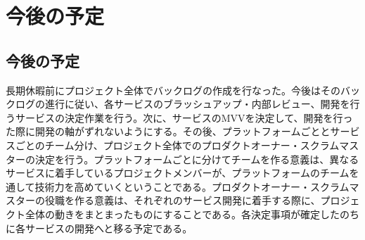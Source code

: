 \chapter{今後の予定}
\section{今後の予定}

長期休暇前にプロジェクト全体でバックログの作成を行なった。今後はそのバックログの進行に従い、各サービスのブラッシュアップ・内部レビュー、開発を行うサービスの決定作業を行う。次に、サービスのMVVを決定して、開発を行った際に開発の軸がずれないようにする。その後、プラットフォームごととサービスごとのチーム分け、プロジェクト全体でのプロダクトオーナー・スクラムマスターの決定を行う。プラットフォームごとに分けてチームを作る意義は、異なるサービスに着手しているプロジェクトメンバーが、プラットフォームのチームを通して技術力を高めていくということである。プロダクトオーナー・スクラムマスターの役職を作る意義は、それぞれのサービス開発に着手する際に、プロジェクト全体の動きをまとまったものにすることである。各決定事項が確定したのちに各サービスの開発へと移る予定である。

